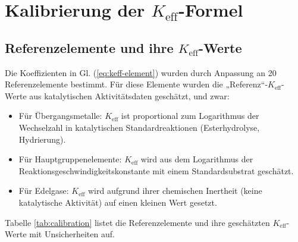 \documentclass[12pt,a4paper]{article}
\newcommand{\Keff}{K_{\mathrm{eff}}}
\begin{document}
	\section{Kalibrierung der $\Keff$-Formel}
	\label{sec:calibration}
	
	\subsection{Referenzelemente und ihre $\Keff$-Werte}
	
	Die Koeffizienten in Gl. (\ref{eq:keff-element}) wurden durch Anpassung an 20 Referenzelemente bestimmt. Für diese Elemente wurden die „Referenz“-$\Keff$-Werte aus katalytischen Aktivitätsdaten geschätzt, und zwar:
	
	\begin{itemize}
		\item Für Übergangsmetalle: $\Keff$ ist proportional zum Logarithmus der Wechselzahl in katalytischen Standardreaktionen (Esterhydrolyse, Hydrierung).
		\item Für Hauptgruppenelemente: $\Keff$ wird aus dem Logarithmus der Reaktionsgeschwindigkeitskonstante mit einem Standardsubstrat geschätzt.
		\item Für Edelgase: $\Keff$ wird aufgrund ihrer chemischen Inertheit (keine katalytische Aktivität) auf einen kleinen Wert gesetzt.
	\end{itemize}
	
	Tabelle \ref{tab:calibration} listet die Referenzelemente und ihre geschätzten $\Keff$-Werte mit Unsicherheiten auf.
	
\end{document}
